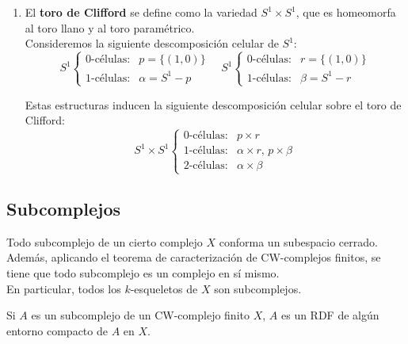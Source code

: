 \begin{ejem}
\begin{enumerate}
\item El \textbf{toro de Clifford} se define como la variedad $S^1\times S^1$, que es homeomorfa al toro llano y al toro paramétrico.\\

Consideremos la siguiente descomposición celular de $S^1$: \[S^1 \begin{cases}
\mbox{0-células:}&p=\{(1,0)\}\\
\mbox{1-células:}&\alpha=S^1-p
\end{cases} \quad
S^1 \begin{cases}
\mbox{0-células:}&r=\{(1,0)\}\\
\mbox{1-células:}&\beta=S^1-r
\end{cases}\]

Estas estructuras inducen la siguiente descomposición celular sobre el toro de Clifford:
\[S^1\times S^1 \begin{cases}
\mbox{0-células:}&p\times r\\
\mbox{1-células:}&\alpha \times r,\, p\times \beta\\
\mbox{2-células:}&\alpha \times \beta
\end{cases}\]
\end{enumerate}
\end{ejem}

\subsection{Subcomplejos}

Todo subcomplejo de un cierto complejo $X$ conforma un subespacio cerrado. Además, aplicando el teorema de caracterización de CW-complejos finitos, se tiene que todo subcomplejo es un complejo en sí mismo.
\\

En particular, todos los $k$-esqueletos de $X$ son subcomplejos.

\begin{prop}Si $A$ es un subcomplejo de un CW-complejo finito $X$, $A$ es un RDF de algún entorno compacto de $A$ en $X$.\end{prop}

